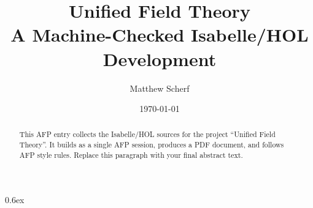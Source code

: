 \documentclass[11pt,a4paper]{article}
\title{Unified Field Theory\\[0.25em]\large A Machine-Checked Isabelle/HOL Development}
\author{Matthew Scherf}
\date{\today}
\begin{document}
\maketitle

\begin{abstract}
This AFP entry collects the Isabelle/HOL sources for the project ``Unified Field Theory''.
It builds as a single AFP session, produces a PDF document, and follows AFP
style rules. Replace this paragraph with your final abstract text.
\end{abstract}

\tableofcontents
\bigskip

\parindent 0pt \parskip 0.6ex




\end{document}
